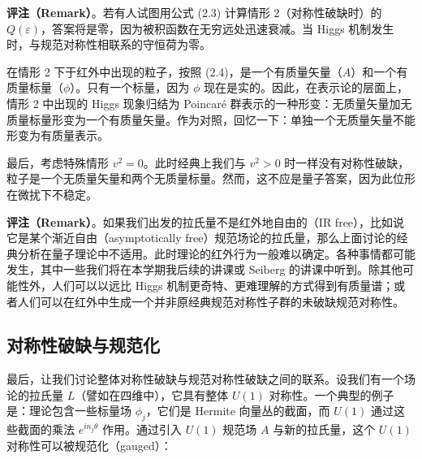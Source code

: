 \textbf{评注（Remark）}。若有人试图用公式 (2.3) 计算情形 2（对称性破缺时）的 $Q(\varepsilon)$，答案将是零，因为被积函数在无穷远处迅速衰减。当 Higgs 机制发生时，与规范对称性相联系的守恒荷为零。


在情形 2 下于红外中出现的粒子，按照 (2.4)，是一个有质量矢量（$A$）和一个有质量标量（$\phi$）。只有一个标量，因为 $\phi$ 现在是实的。因此，在表示论的层面上，情形 2 中出现的 Higgs 现象归结为 Poincaré 群表示的一种形变：无质量矢量加无质量标量形变为一个有质量矢量。作为对照，回忆一下：单独一个无质量矢量不能形变为有质量表示。

最后，考虑特殊情形 $v^2=0$。此时经典上我们与 $v^2>0$ 时一样没有对称性破缺，粒子是一个无质量矢量和两个无质量标量。然而，这不应是量子答案，因为此位形在微扰下不稳定。


\textbf{评注（Remark）}。如果我们出发的拉氏量不是红外地自由的（IR free），比如说它是某个渐近自由（asymptotically free）规范场论的拉氏量，那么上面讨论的经典分析在量子理论中不适用。此时理论的红外行为一般难以确定。各种事情都可能发生，其中一些我们将在本学期我后续的讲课或 Seiberg 的讲课中听到。除其他可能性外，人们可以以远比 Higgs 机制更奇特、更难理解的方式得到有质量谱；或者人们可以在红外中生成一个并非原经典规范对称性子群的未破缺规范对称性。

\subsection{对称性破缺与规范化}

最后，让我们讨论整体对称性破缺与规范对称性破缺之间的联系。设我们有一个场论的拉氏量 $L$（譬如在四维中），它具有整体 $U(1)$ 对称性。一个典型的例子是：理论包含一些标量场 $\phi_j$，它们是 Hermite 向量丛的截面，而 $U(1)$ 通过这些截面的乘法 $e^{in_j\theta}$ 作用。通过引入 $U(1)$ 规范场 $A$ 与新的拉氏量，这个 $U(1)$ 对称性可以被规范化（gauged）：

